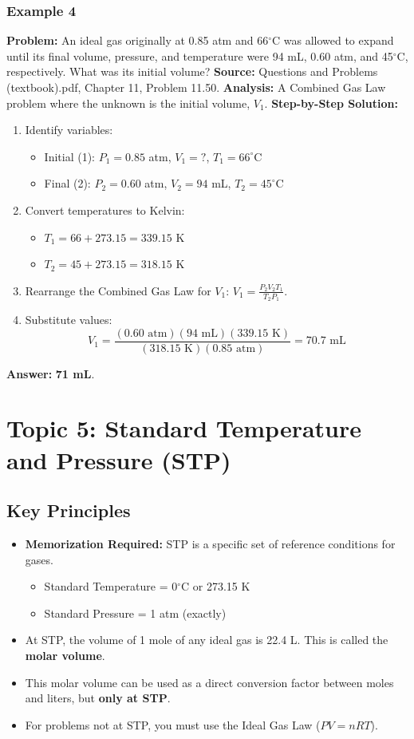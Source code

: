 \documentclass{article}
\begin{document}
\subsubsection{Example 4}
\textbf{Problem:} An ideal gas originally at 0.85 atm and 66$^\circ$C was allowed to expand until its final volume, pressure, and temperature were 94 mL, 0.60 atm, and 45$^\circ$C, respectively. What was its initial volume?
\textbf{Source:} Questions and Problems (textbook).pdf, Chapter 11, Problem 11.50.
\textbf{Analysis:} A Combined Gas Law problem where the unknown is the initial volume, $V_1$.
\textbf{Step-by-Step Solution:}
\begin{enumerate}
    \item Identify variables:
    \begin{itemize}
        \item Initial (1): $P_1 = 0.85$ atm, $V_1 = ?$, $T_1 = 66^\circ$C
        \item Final (2): $P_2 = 0.60$ atm, $V_2 = 94$ mL, $T_2 = 45^\circ$C
    \end{itemize}
    \item Convert temperatures to Kelvin:
    \begin{itemize}
        \item $T_1 = 66 + 273.15 = 339.15$ K
        \item $T_2 = 45 + 273.15 = 318.15$ K
    \end{itemize}
    \item Rearrange the Combined Gas Law for $V_1$: $V_1 = \frac{P_2 V_2 T_1}{T_2 P_1}$.
    \item Substitute values:
    \[ V_1 = \frac{(0.60 \text{ atm})(94 \text{ mL})(339.15 \text{ K})}{(318.15 \text{ K})(0.85 \text{ atm})} = 70.7 \text{ mL} \]
\end{enumerate}
\textbf{Answer:} \textbf{71 mL}.

\section{Topic 5: Standard Temperature and Pressure (STP)}
\subsection{Key Principles}
\begin{itemize}
    \item \textbf{Memorization Required:} STP is a specific set of reference conditions for gases.
        \begin{itemize}
            \item Standard Temperature = 0$^\circ$C or 273.15 K
            \item Standard Pressure = 1 atm (exactly)
        \end{itemize}
    \item At STP, the volume of 1 mole of any ideal gas is 22.4 L. This is called the \textbf{molar volume}.
    \item This molar volume can be used as a direct conversion factor between moles and liters, but \textbf{only at STP}.
    \item For problems not at STP, you must use the Ideal Gas Law ($PV=nRT$).
\end{itemize}
\end{document}
